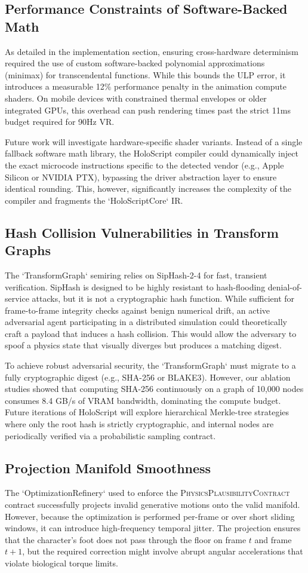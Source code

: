 \documentclass[sigconf,nonacm]{acmart}
\newcommand{\plausibility}{\textsc{PhysicsPlausibilityContract}}
\begin{document}
\subsection{Performance Constraints of Software-Backed Math} As detailed in the
implementation section, ensuring cross-hardware determinism required the use of
custom software-backed polynomial approximations (minimax) for transcendental
functions. While this bounds the ULP error, it introduces a measurable 12\%
performance penalty in the animation compute shaders. On mobile devices with
constrained thermal envelopes or older integrated GPUs, this overhead can push
rendering times past the strict 11ms budget required for 90Hz VR.

Future work will investigate hardware-specific shader variants. Instead of a
single fallback software math library, the HoloScript compiler could dynamically
inject the exact microcode instructions specific to the detected vendor (e.g.,
Apple Silicon or NVIDIA PTX), bypassing the driver abstraction layer to ensure
identical rounding. This, however, significantly increases the complexity of the
compiler and fragments the `HoloScriptCore` IR.

\subsection{Hash Collision Vulnerabilities in Transform Graphs} The
`TransformGraph` semiring relies on SipHash-2-4 for fast, transient
verification. SipHash is designed to be highly resistant to hash-flooding
denial-of-service attacks, but it is not a cryptographic hash function. While
sufficient for frame-to-frame integrity checks against benign numerical drift,
an active adversarial agent participating in a distributed simulation could
theoretically craft a payload that induces a hash collision. This would allow
the adversary to spoof a physics state that visually diverges but produces a
matching digest.

To achieve robust adversarial security, the `TransformGraph` must migrate to a
fully cryptographic digest (e.g., SHA-256 or BLAKE3). However, our ablation
studies showed that computing SHA-256 continuously on a graph of 10,000 nodes
consumes 8.4 GB/s of VRAM bandwidth, dominating the compute budget. Future
iterations of HoloScript will explore hierarchical Merkle-tree strategies where
only the root hash is strictly cryptographic, and internal nodes are
periodically verified via a probabilistic sampling contract.

\subsection{Projection Manifold Smoothness} The `OptimizationRefinery` used to
enforce the \plausibility{} contract successfully projects invalid generative
motions onto the valid manifold. However, because the optimization is performed
per-frame or over short sliding windows, it can introduce high-frequency
temporal jitter. The projection ensures that the character's foot does not pass
through the floor on frame $t$ and frame $t+1$, but the required correction
might involve abrupt angular accelerations that violate biological torque
limits.
\end{document}

